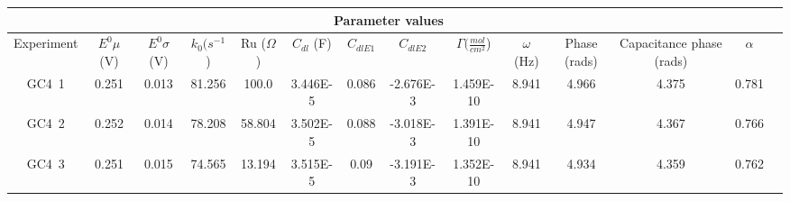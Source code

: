 \documentclass[preview]{standalone}
\begin{document}
\begin{center}
\begin{tabular}{|c|c|c|c|c|c|c|c|c|c|c|c|c|c|}
\hline
\multicolumn{13}{|c|}{Parameter values}\\ 
\hline
Experiment & $E^0 \mu$ (V) & $E^0 \sigma$ (V) & $k_0 (s^{-1}$) & Ru ($\Omega$) & $C_{dl}$ (F) & $C_{dlE1}$ & $C_{dlE2}$ & $\Gamma (\frac{mol}{cm^{2}}$) & $\omega$ (Hz) & Phase (rads) & Capacitance phase (rads) & $\alpha$\\
\hline
GC4\ 1 & 0.251 & 0.013 & 81.256 & 100.0 & 3.446E-5 & 0.086 & -2.676E-3 & 1.459E-10 & 8.941 & 4.966 & 4.375 & 0.781\\
\hline
GC4\ 2 & 0.252 & 0.014 & 78.208 & 58.804 & 3.502E-5 & 0.088 & -3.018E-3 & 1.391E-10 & 8.941 & 4.947 & 4.367 & 0.766\\
\hline
GC4\ 3 & 0.251 & 0.015 & 74.565 & 13.194 & 3.515E-5 & 0.09 & -3.191E-3 & 1.352E-10 & 8.941 & 4.934 & 4.359 & 0.762\\
\hline
\end{tabular}
\end{center}
\end{document}
